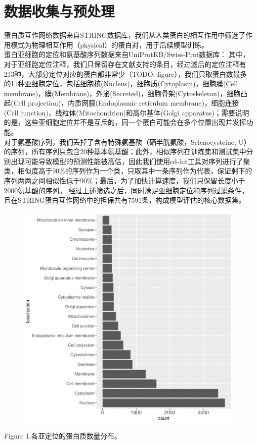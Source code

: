 \documentclass[a4paper,UTF8]{article}
\begin{document}
\section{数据收集与预处理}

蛋白质互作网络数据来自STRING数据库，我们从人类蛋白的相互作用中筛选了作用模式为物理相互作用（physical）的蛋白对，用于后续模型训练。\\

蛋白亚细胞的定位和氨基酸序列数据来自UniProtKB/Swiss-Prot数据库：
其中，对于亚细胞定位注释，我们只保留存在文献支持的条目，经过滤后的定位注释有213种，大部分定位对应的蛋白都非常少（TODO: figure），我们只取蛋白数最多的11种亚细胞定位，包括细胞核(Nucleus)，细胞质(Cytoplasm)，细胞膜(Cell membrane)，膜(Membrane)，外泌(Secreted)，细胞骨架(Cytoskeleton)，细胞凸起(Cell projection)，内质网膜(Endoplasmic reticulum membrane)，细胞连接(Cell junction)，线粒体(Mitochondrion)和高尔基体(Golgi apparatus)；需要说明的是，这些亚细胞定位并不是互斥的，同一个蛋白可能会在多个位置出现并发挥功能。\\

对于氨基酸序列，我们丢掉了含有特殊氨基酸（硒半胱氨酸，Selenocysteine, U）的序列，所有序列只包含20种基本氨基酸；此外，相似序列在训练集和测试集中分别出现可能导致模型的预测性能被高估，因此我们使用cd-hit工具对序列进行了聚类，相似度高于90\%的序列作为一个类，只取其中一条序列作为代表，保证剩下的序列两两之间相似性低于90\%；最后，为了加快计算速度，我们只保留长度小于2000氨基酸的序列。
经过上述筛选之后，同时满足亚细胞定位和序列过滤条件，且在STRING蛋白互作网络中的担保共有7591条，构成模型评估的核心数据集。

\begin{figure}[H]
	\centering\includegraphics[scale=0.5]{../data/summary/loc_short.pdf}
\end{figure}
Figure 1.各亚定位的蛋白质数量分布。\\
\end{document}
